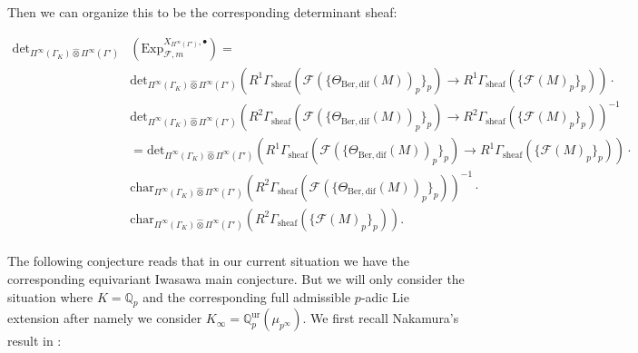 \documentclass[12pt]{amsart}
\theoremstyle{definition}
\numberwithin{equation}{section}
\begin{document}
Then we can organize this to be the corresponding determinant sheaf:

\begin{align}
\mathrm{det}_{\Pi^\infty(\Gamma_K)\widehat{\otimes}\Pi^\infty(\Gamma')}&(\mathrm{Exp}^{X_{\Pi^\infty(\Gamma')},\bullet}_{\mathcal{F},m})=	\\
& \mathrm{det}_{\Pi^\infty(\Gamma_K)\widehat{\otimes}\Pi^\infty(\Gamma')}(R^1\Gamma_\mathrm{sheaf}(\mathcal{F}(\{\Theta_{\mathrm{Ber,dif}}(M))_p\}_p) \rightarrow R^1\Gamma_\mathrm{sheaf}(\{\mathcal{F}(M)_p\}_p))\cdot\\
&\mathrm{det}_{\Pi^\infty(\Gamma_K)\widehat{\otimes}\Pi^\infty(\Gamma')}(R^2\Gamma_\mathrm{sheaf}(\mathcal{F}(\{\Theta_{\mathrm{Ber,dif}}(M))_p\}_p) \rightarrow R^2\Gamma_\mathrm{sheaf}(\{\mathcal{F}(M)_p\}_p))^{-1}\\
&= \mathrm{det}_{\Pi^\infty(\Gamma_K)\widehat{\otimes}\Pi^\infty(\Gamma')}(R^1\Gamma_\mathrm{sheaf}(\mathcal{F}(\{\Theta_{\mathrm{Ber,dif}}(M))_p\}_p) \rightarrow R^1\Gamma_\mathrm{sheaf}(\{\mathcal{F}(M)_p\}_p))\cdot\\
&\mathrm{char}_{\Pi^\infty(\Gamma_K)\widehat{\otimes}\Pi^\infty(\Gamma')}(R^2\Gamma_\mathrm{sheaf}(\mathcal{F}(\{\Theta_{\mathrm{Ber,dif}}(M))_p\}_p))^{-1}\cdot\\
&\mathrm{char}_{\Pi^\infty(\Gamma_K)\widehat{\otimes}\Pi^\infty(\Gamma')}(R^2\Gamma_\mathrm{sheaf}(\{\mathcal{F}(M)_p\}_p)). 
\end{align}\\


\indent The following conjecture reads that in our current situation we have the corresponding equivariant Iwasawa main conjecture. But we will only consider the situation where $K=\mathbb{Q}_p$ and the corresponding full admissible $p$-adic Lie extension after \cite{LZ1} namely we consider $K_\infty=\mathbb{Q}^\mathrm{ur}_p(\mu_{p^\infty})$. We first recall Nakamura's result in \cite{Nakamura1}:
\end{document}
